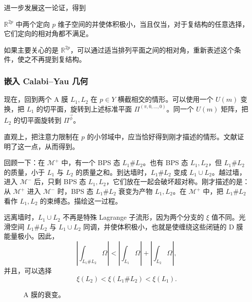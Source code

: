 进一步发展这一论证，得到
\begin{theorem}\label{thm:5.6}
$\mathbb{R}^{2p}$ 中两个定向 $p$ 维子空间的并使体积极小，当且仅当，对于复结构的任意选择，它们定向的相对角都不满足。
\end{theorem}

如果主要关心的是 $\mathbb{R}^{2p}$，可以通过适当排列平面之间的相对角，重新表述这个条件，使之不再提到复结构。

\subsubsection{嵌入 Calabi--Yau 几何}\label{sec:5.2.1.6}

现在，回到两个 A 膜 $L_1,L_2$ 在 $p\in Y$ 横截相交的情形。可以使用一个 $U(m)$ 变换，把 $L_1$ 的切平面，旋转到上述标准平面 $\Pi^{(\pi,0,\ldots,0)}$。同一个 $U(m)$ 矩阵，把 $L_2$ 的切平面旋转到 $\Pi^{\vec\phi}$。

直观上，把注意力限制在 $p$ 的小邻域中，应当恰好得到刚才描述的情形。文献证明了这一点，从而得到。

回顾一下：在 $\mathcal{M}^+$ 中，有一个 BPS 态 $L_1\#L_2$。也有 BPS 态 $L_1,L_2$，但 $L_1\#L_2$ 的质量，小于 $L_1$ 与 $L_2$ 的质量之和。到达墙时，$L_1\#L_2$ 变成 $L_1\cup L_2$。越过墙，进入 $\mathcal{M}^-$ 后，只剩 BPS 态 $L_1,L_2$，它们放在一起会破坏超对称。刚才描述的是：从 $\mathcal{M}^+$ 进入 $\mathcal{M}^-$ 时，BPS 态 $L_1\#L_2$ 衰变为产物 $L_1,L_2$。在 $\mathcal{M}^+$ 中，把 $L_1\#L_2$ 看作 $L_1,L_2$ 的束缚态。描绘这一过程。

远离墙时，$L_1\cup L_2$ 不再是特殊 Lagrange 子流形，因为两个分支的 $\xi$ 值不同。光滑空间 $L_1\#L_2$ 与 $L_1\cup L_2$ 同调，并使体积极小，也就是使缠绕这些闭链的 D 膜能量极小。因此，
\begin{equation}\label{eq:5.30}
\left|\int_{L_1\#L_2}\Omega\right|
<\left|\int_{L_1}\Omega\right|+\left|\int_{L_2}\Omega\right|,
\end{equation}
并且，可以选择
\begin{equation}\label{eq:5.31}
\xi(L_2)<\xi(L_1\#L_2)<\xi(L_1).
\end{equation}
\begin{figure}[H]
\centering
{}
\caption{A 膜的衰变。}\label{fig:5.3}
\end{figure}

